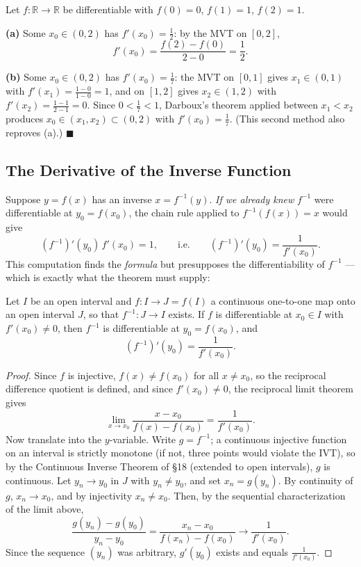 \documentclass[11pt]{report}
\begin{document}
\begin{exbox}
Let $f: \mathbb{R} \to \mathbb{R}$ be differentiable with $f(0) = 0$, $f(1) = 1$, $f(2) = 1$.

\textbf{(a)} Some $x_0 \in (0,2)$ has $f'(x_0) = \tfrac12$: by the MVT on $[0,2]$,
\[
f'(x_0) = \frac{f(2) - f(0)}{2 - 0} = \frac12.
\]

\textbf{(b)} Some $x_0 \in (0,2)$ has $f'(x_0) = \tfrac17$: the MVT on $[0,1]$ gives $x_1 \in (0,1)$ with $f'(x_1) = \tfrac{1-0}{1-0} = 1$, and on $[1,2]$ gives $x_2 \in (1,2)$ with $f'(x_2) = \tfrac{1-1}{2-1} = 0$. Since $0 < \tfrac17 < 1$, Darboux's theorem applied between $x_1 < x_2$ produces $x_0 \in (x_1, x_2) \subset (0,2)$ with $f'(x_0) = \tfrac17$. (This second method also reproves (a).) \hfill $\blacksquare$
\end{exbox}

\subsection{The Derivative of the Inverse Function}

Suppose $y = f(x)$ has an inverse $x = f^{-1}(y)$. \emph{If we already knew} $f^{-1}$ were differentiable at $y_0 = f(x_0)$, the chain rule applied to $f^{-1}(f(x)) = x$ would give
\[
(f^{-1})'(y_0)\, f'(x_0) = 1, \qquad \text{i.e.} \qquad (f^{-1})'(y_0) = \frac{1}{f'(x_0)}.
\]
This computation finds the \emph{formula} but presupposes the differentiability of $f^{-1}$ --- which is exactly what the theorem must supply:

\begin{thmbox}
Let $I$ be an open interval and $f: I \to J = f(I)$ a continuous one-to-one map onto an open interval $J$, so that $f^{-1}: J \to I$ exists. If $f$ is differentiable at $x_0 \in I$ with $f'(x_0) \neq 0$, then $f^{-1}$ is differentiable at $y_0 = f(x_0)$, and
\[
(f^{-1})'(y_0) = \frac{1}{f'(x_0)}.
\]
\end{thmbox}

\begin{proof}
Since $f$ is injective, $f(x) \neq f(x_0)$ for all $x \neq x_0$, so the reciprocal difference quotient is defined, and since $f'(x_0) \neq 0$, the reciprocal limit theorem gives
\[
\lim_{x \to x_0} \frac{x - x_0}{f(x) - f(x_0)} = \frac{1}{f'(x_0)}.
\]
Now translate into the $y$-variable. Write $g = f^{-1}$; a continuous injective function on an interval is strictly monotone (if not, three points would violate the IVT), so by the Continuous Inverse Theorem of \S 18 (extended to open intervals), $g$ is continuous. Let $y_n \to y_0$ in $J$ with $y_n \neq y_0$, and set $x_n = g(y_n)$. By continuity of $g$, $x_n \to x_0$, and by injectivity $x_n \neq x_0$. Then, by the sequential characterization of the limit above,
\[
\frac{g(y_n) - g(y_0)}{y_n - y_0} = \frac{x_n - x_0}{f(x_n) - f(x_0)} \longrightarrow \frac{1}{f'(x_0)}.
\]
Since the sequence $(y_n)$ was arbitrary, $g'(y_0)$ exists and equals $\tfrac{1}{f'(x_0)}$.
\end{proof}
\end{document}

